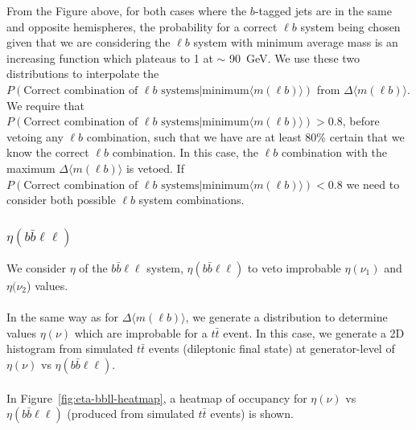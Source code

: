 From the Figure above, for both cases where the $b$-tagged jets are in the same and opposite hemispheres, the probability for a correct $\ell b$ system being chosen given that we are considering the $\ell b$ system with minimum average mass is an increasing function which plateaus to 1 at $\sim$ \SI{90}{\GeV}. We use these two distributions to interpolate the $P(\text{Correct combination of } \ell b \text{ systems} | \text{minimum} \langle m(\ell b) \rangle)$ from $\Delta \langle m(\ell b) \rangle$. We require that $P(\text{Correct combination of } \ell b \text{ systems} | \text{minimum} \langle m(\ell b) \rangle) > 0.8$, before vetoing any $\ell b$ combination, such that we have are at least 80$\%$ certain that we know the correct $\ell b$ combination. In this case, the $\ell b$ combination with the maximum $\Delta \langle m(\ell b) \rangle$ is vetoed. If $P(\text{Correct combination of } \ell b \text{ systems} | \text{minimum} \langle m(\ell b) \rangle) < 0.8$ we need to consider both possible $\ell b$ system combinations. 

\subsubsection{$\eta(b\bar{b}\ell\ell)$}
\label{sec:eta-llbb-subsection}

We consider $\eta$ of the $b\bar{b}\ell\ell$ system, $\eta(b\bar{b}\ell\ell)$ to veto improbable $\eta(\nu_{1})$ and $\eta(\nu_{2}$) values.\\\\

In the same way as for $\Delta \langle m(\ell b)\rangle$, we generate a distribution to determine values $\eta(\nu)$ which are improbable for a $t\bar{t}$ event. In this case, we generate a 2D histogram from simulated $t\bar{t}$ events (dileptonic final state) at generator-level of $\eta (\nu)$ vs $\eta(b\bar{b}\ell\ell)$.\\\\
In Figure~\ref{fig:eta-bbll-heatmap}, a heatmap of occupancy for $\eta (\nu)$ vs $\eta(b\bar{b}\ell\ell)$ (produced from simulated $t\bar{t}$ events) is shown. 

